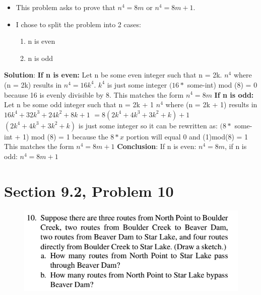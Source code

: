 \documentclass{article}
\begin{document}
\begin{large}
\begin{itemize}
    \item This problem asks to prove that $n^4 = 8m$ or $n^4 = 8m + 1$. \newline
    \item I chose to split the problem into 2 cases: 
    \begin{enumerate}
        \item n is even
        \item n is odd
    \end{enumerate}
\end{itemize}
\textbf{Solution}:\newline 
\textbf{If n is even:} \newline 
Let n be some even integer such that n = 2k. \newline
$n^4$ where (n = 2k) results in $n^4 = 16k^4$. $k^4$ is just some integer
\newline
$(16*$ some-int) mod (8) = 0 because 16 is evenly divisible by 8. 
\newline This matches the form $n^4 = 8m$ \newline \newline
\textbf{If n is odd:} \newline
Let n be some odd integer such that n = 2k + 1 \newline
$n^4$ where (n = 2k + 1) results in \newline $16k^4 + 32k^3 + 24k^2 + 8k + 1$ \newline
$= 8(2k^4 + 4k^3 + 3k^2 + k) + 1$ \newline
$(2k^4 + 4k^3 + 3k^2 + k)$ is just some integer so it can be rewritten as: \newline
$(8*$ some-int + 1) mod (8) = 1 because the $8*x$ portion will equal 0 and (1)mod(8) = 1
\newline This matches the form $n^4 = 8m + 1$ \newline
\newline \textbf{Conclusion}: If n is even: $n^4 = 8m$, if n is odd: $n^4 = 8m + 1$

\clearpage
\header

\section*{Section 9.2, Problem 10}

\begin{figure}[h]
\includegraphics[scale = 0.9]{HW2Prob4}
\centering
\end{figure}


\end{large}
\end{document}
